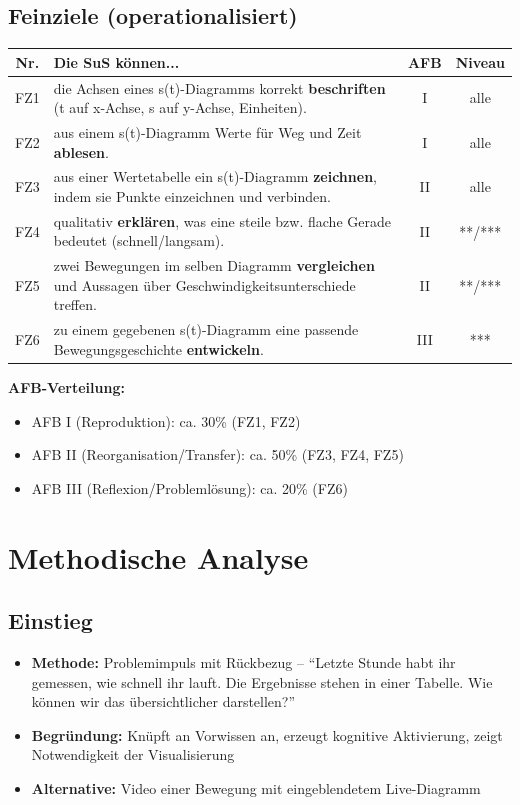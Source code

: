 \documentclass[11pt,a4paper]{article}
\begin{document}
\subsection{Feinziele (operationalisiert)}
\begin{tabular}{|c|p{8.5cm}|c|c|}
\hline
\textbf{Nr.} & \textbf{Die SuS können...} & \textbf{AFB} & \textbf{Niveau} \\
\hline
FZ1 & die Achsen eines s(t)-Diagramms korrekt \textbf{beschriften} (t auf x-Achse, s auf y-Achse, Einheiten). & I & alle \\
\hline
FZ2 & aus einem s(t)-Diagramm Werte für Weg und Zeit \textbf{ablesen}. & I & alle \\
\hline
FZ3 & aus einer Wertetabelle ein s(t)-Diagramm \textbf{zeichnen}, indem sie Punkte einzeichnen und verbinden. & II & alle \\
\hline
FZ4 & qualitativ \textbf{erklären}, was eine steile bzw. flache Gerade bedeutet (schnell/langsam). & II & **/*** \\
\hline
FZ5 & zwei Bewegungen im selben Diagramm \textbf{vergleichen} und Aussagen über Geschwindigkeitsunterschiede treffen. & II & **/*** \\
\hline
FZ6 & zu einem gegebenen s(t)-Diagramm eine passende Bewegungsgeschichte \textbf{entwickeln}. & III & *** \\
\hline
\end{tabular}

\vspace{1em}
\textbf{AFB-Verteilung:}
\begin{itemize}
    \item AFB I (Reproduktion): ca. 30\% (FZ1, FZ2)
    \item AFB II (Reorganisation/Transfer): ca. 50\% (FZ3, FZ4, FZ5)
    \item AFB III (Reflexion/Problemlösung): ca. 20\% (FZ6)
\end{itemize}

\section{Methodische Analyse}

\subsection{Einstieg}
\begin{itemize}
    \item \textbf{Methode:} Problemimpuls mit Rückbezug -- ``Letzte Stunde habt ihr gemessen, wie schnell ihr lauft. Die Ergebnisse stehen in einer Tabelle. Wie können wir das übersichtlicher darstellen?''
    \item \textbf{Begründung:} Knüpft an Vorwissen an, erzeugt kognitive Aktivierung, zeigt Notwendigkeit der Visualisierung
    \item \textbf{Alternative:} Video einer Bewegung mit eingeblendetem Live-Diagramm
\end{itemize}
\end{document}
